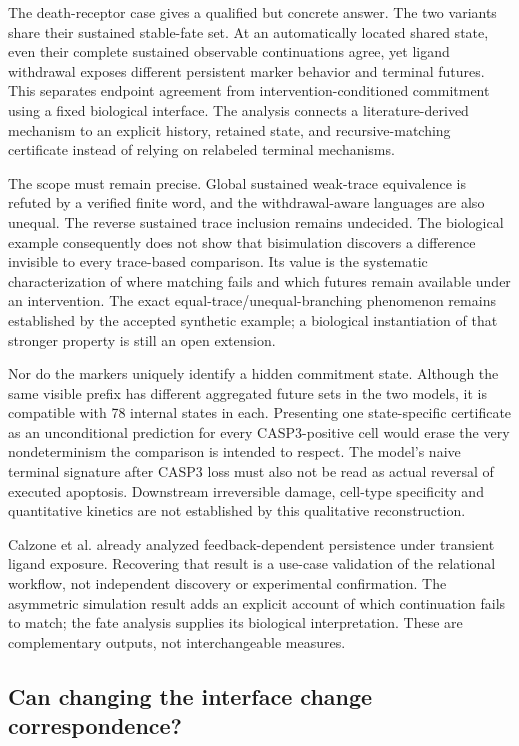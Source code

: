 \documentclass{ws-jbcb}
\numberwithin{equation}{section}
\newcommand{\DRHistoryStates}{78}
\begin{document}
The death-receptor case gives a qualified but concrete answer. The two
variants share their sustained stable-fate set. At an automatically located
shared state, even their complete sustained observable continuations agree,
yet ligand withdrawal exposes different persistent marker behavior and terminal
futures. This separates endpoint agreement from intervention-conditioned
commitment using a fixed biological interface. The analysis connects a
literature-derived mechanism to an explicit history, retained state, and
recursive-matching certificate instead of relying on relabeled terminal
mechanisms.

The scope must remain precise. Global sustained weak-trace equivalence is
refuted by a verified finite word, and the withdrawal-aware languages are
also unequal. The reverse sustained trace inclusion remains undecided.
The biological example consequently does not show that bisimulation discovers
a difference invisible to every trace-based comparison. Its value is the
systematic characterization of where matching fails and which futures remain
available under an intervention. The exact equal-trace/unequal-branching
phenomenon remains established by the accepted synthetic example; a biological
instantiation of that stronger property is still an open extension.

Nor do the markers uniquely identify a hidden commitment state. Although the
same visible prefix has different aggregated future sets in the two models,
it is compatible with \DRHistoryStates{} internal states in each. Presenting
one state-specific certificate as an unconditional prediction for every
CASP3-positive cell would erase the very nondeterminism the comparison is
intended to respect. The model's naive terminal signature after CASP3 loss
must also not be read as actual reversal of executed apoptosis. Downstream
irreversible damage, cell-type specificity and quantitative kinetics are not
established by this qualitative reconstruction.

Calzone et al. already analyzed feedback-dependent persistence under transient
ligand exposure.\cite{Calzone2010} Recovering that result is a use-case validation
of the relational workflow, not independent discovery or experimental
confirmation. The asymmetric simulation result adds an explicit account of
which continuation fails to match; the fate analysis supplies its biological
interpretation. These are complementary outputs, not interchangeable measures.

\subsection{Can changing the interface change correspondence?}
\end{document}

